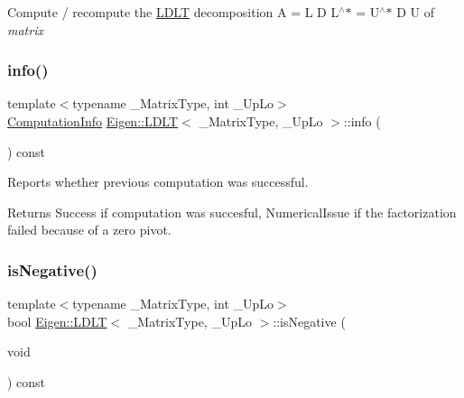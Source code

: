 Compute / recompute the \mbox{\hyperlink{class_eigen_1_1_l_d_l_t}{L\+D\+LT}} decomposition A = L D L$^\wedge$$\ast$ = U$^\wedge$$\ast$ D U of {\itshape matrix} \mbox{\label{class_eigen_1_1_l_d_l_t_a6bd6008501a537d2e16ea672a853bf3e}} 
\subsubsection{\texorpdfstring{info()}{info()}}
{\footnotesize\ttfamily template$<$typename \+\_\+\+Matrix\+Type, int \+\_\+\+Up\+Lo$>$ \\
\mbox{\hyperlink{group__enums_ga85fad7b87587764e5cf6b513a9e0ee5e}{Computation\+Info}} \mbox{\hyperlink{class_eigen_1_1_l_d_l_t}{Eigen\+::\+L\+D\+LT}}$<$ \+\_\+\+Matrix\+Type, \+\_\+\+Up\+Lo $>$\+::info (\begin{DoxyParamCaption}{ }\end{DoxyParamCaption}) const\hspace{0.3cm}{\ttfamily [inline]}}



Reports whether previous computation was successful. 

\begin{DoxyReturn}{Returns}
{\ttfamily Success} if computation was succesful, {\ttfamily Numerical\+Issue} if the factorization failed because of a zero pivot. 
\end{DoxyReturn}
\mbox{\label{class_eigen_1_1_l_d_l_t_aabd3e7aebe844034caca4c62dbe9c1eb}} 
\subsubsection{\texorpdfstring{isNegative()}{isNegative()}}
{\footnotesize\ttfamily template$<$typename \+\_\+\+Matrix\+Type, int \+\_\+\+Up\+Lo$>$ \\
bool \mbox{\hyperlink{class_eigen_1_1_l_d_l_t}{Eigen\+::\+L\+D\+LT}}$<$ \+\_\+\+Matrix\+Type, \+\_\+\+Up\+Lo $>$\+::is\+Negative (\begin{DoxyParamCaption}\item[{void}]{ }\end{DoxyParamCaption}) const\hspace{0.3cm}{\ttfamily [inline]}}

